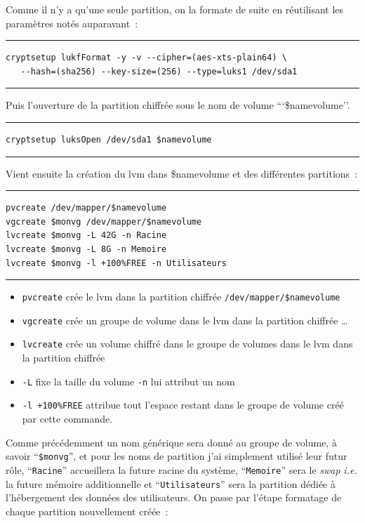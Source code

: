 \documentclass[12pt, a4paper]{report}
\begin{document}
Comme il n'y a qu'une seule partition, on la formate de suite en réutilisant les paramètres notés auparavant~:

\noindent \rule{\linewidth}{0.5pt}
\begin{verbatim}
cryptsetup lukfFormat -y -v --cipher=(aes-xts-plain64) \
   --hash=(sha256) --key-size=(256) --type=luks1 /dev/sda1
\end{verbatim}
\rule{\linewidth}{0.5pt}

Puis l'ouverture de la partition chiffrée sous le nom de volume ```\$namevolume''.

\noindent \rule{\linewidth}{0.5pt}
\begin{verbatim}
cryptsetup luksOpen /dev/sda1 $namevolume
\end{verbatim}
\rule{\linewidth}{0.5pt}

Vient ensuite la création du lvm dans \$namevolume et des différentes partitions~:

\noindent \rule{\linewidth}{0.5pt}
\begin{verbatim}
pvcreate /dev/mapper/$namevolume
vgcreate $monvg /dev/mapper/$namevolume
lvcreate $monvg -L 42G -n Racine
lvcreate $monvg -L 8G -n Memoire
lvcreate $monvg -l +100%FREE -n Utilisateurs
\end{verbatim}
\rule{\linewidth}{0.5pt}

\begin{itemize}
	\item \texttt{pvcreate} crée le lvm dans la partition chiffrée \texttt{/dev/mapper/\${}namevolume}
	\item \texttt{vgcreate} crée un groupe de volume dans le lvm dans la partition chiffrée \ldots
	\item \texttt{lvcreate} crée un volume chiffré dans le groupe de volumes dans le lvm dans la partition chiffrée
	\item \texttt{-L} fixe la taille du volume \texttt{-n} lui attribut un nom
	\item \texttt{-l +100\%{}FREE} attribue tout l'espace restant dans le groupe de volume créé par cette commande.
\end{itemize}

Comme précédemment un nom générique sera donné au groupe de volume, à savoir ``\texttt{\${}monvg}'', et pour les noms de partition j'ai simplement utilisé leur futur rôle, ``\texttt{Racine}'' accueillera la future racine du système, ``\texttt{Memoire}'' sera le \emph{swap} \emph{i.e.\/} la future mémoire additionnelle et ``\texttt{Utilisateurs}'' sera la partition dédiée à l'hébergement des données des utilisateurs.
On passe par l'étape formatage de chaque partition nouvellement créée~:
\end{document}
